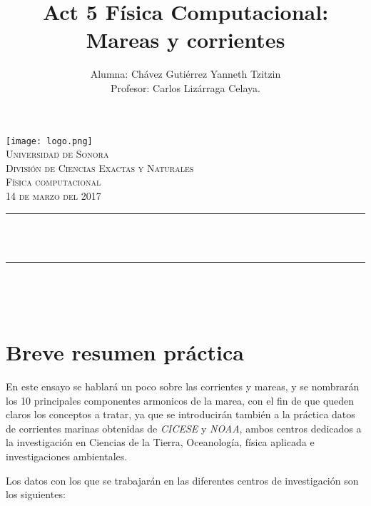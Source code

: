 \documentclass[12pt]{article}
\title{Act 5 Física Computacional: Mareas y corrientes} %
\author {Alumna: Chávez Gutiérrez Yanneth Tzitzin \\ Profesor: Carlos Lizárraga Celaya. }											%
\makeatletter
\let\thetitle\@title
\let\theauthor\@author
\makeatother
\begin{document}

\begin{titlepage}
	\centering
    \vspace*{0.5 cm}
\texttt{[image: logo.png]}\\%
    \textsc{\Large Universidad de Sonora}\\[1.0 cm]	%
	\textsc{\Large División de Ciencias Exactas y Naturales}\\[0.5 cm]				%
	\textsc{\large Física computacional}\\[0.5 cm]
   \textsc {14 de marzo del 2017} 	
\rule{\linewidth}{0.2 mm} \\[0.4 cm]
	{ \huge \bfseries \thetitle}\\
	\rule{\linewidth}{0.2 mm} \\[0.5 cm]
	
	\begin{minipage}{\textwidth}
		\begin{flushleft} 
        \begin{center}
			\theauthor
             \end{center}
			\end{flushleft}
	\end{minipage}\\[1 cm]
	
 
	\vfill
	
\end{titlepage}
\pagebreak



\section{Breve resumen práctica}
En este ensayo se hablará un poco sobre las corrientes y mareas, y se nombrarán los 10 principales componentes armonicos de la marea, con el fin de que queden claros los conceptos a tratar, ya que se introducirán también a la práctica datos de corrientes marinas obtenidas de \textit{CICESE} y \textit{NOAA}, ambos centros dedicados a la investigación en Ciencias de la Tierra, Oceanología, física aplicada e investigaciones ambientales.

Los datos con los que se trabajarán en las diferentes centros de investigación son los siguientes:
\end{document}
